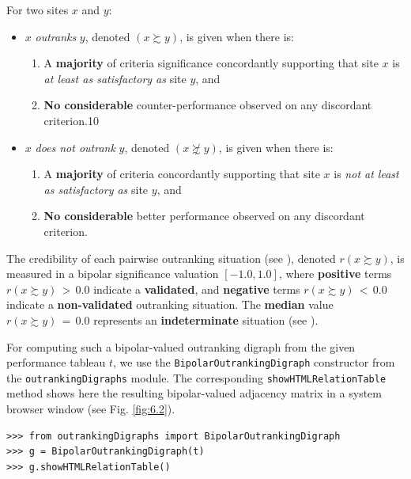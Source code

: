 For two sites $x$ and $y$:
\begin{itemize}
\item $x$ \emph{outranks} $y$, denoted $(x \succsim y)$, is given when there is:
   \begin{enumerate}
     \item A \textbf{majority} of criteria significance concordantly supporting that site $x$ is \emph{at least as satisfactory as} site $y$, and
     \item \textbf{No considerable} counter-performance observed on any discordant criterion.10
       
    \end{enumerate}
\item $x$ \emph{does not outrank} $y$, denoted $(x \not\succsim y)$, is given when there is:
   \begin{enumerate}
    \item A \textbf{majority} of criteria concordantly supporting that site $x$ is \emph{not at least as satisfactory as} site $y$, and
    \item \textbf{No considerable} better performance observed on any discordant criterion.
    \end{enumerate}
\end{itemize}

The credibility of each pairwise outranking situation (see \citep{BIS-2013}), denoted $r(x \succsim y)$, is measured in a bipolar significance valuation $[-1.0, 1.0]$, where \textbf{positive} terms $r(x \succsim y)\, >\, 0.0$ indicate a \textbf{validated}, and \textbf{negative} terms $r(x \succsim y)\, <\, 0.0$ indicate a \textbf{non-validated} outranking situation. The \textbf{median} value $r(x \succsim y)\, = \,0.0$ represents an \textbf{indeterminate} situation (see \citep{BIS-2004a}).   

For computing such a bipolar-valued outranking digraph from the given performance tableau $t$, we use the \texttt{BipolarOutrankingDigraph} constructor from the \texttt{outrankingDigraphs} module. The corresponding \texttt{showHTMLRelationTable} method shows here the resulting bipolar-valued adjacency matrix in a system browser window (see Fig. \ref{fig:6.2}).

\begin{lstlisting}
>>> from outrankingDigraphs import BipolarOutrankingDigraph
>>> g = BipolarOutrankingDigraph(t)
>>> g.showHTMLRelationTable()
\end{lstlisting}

